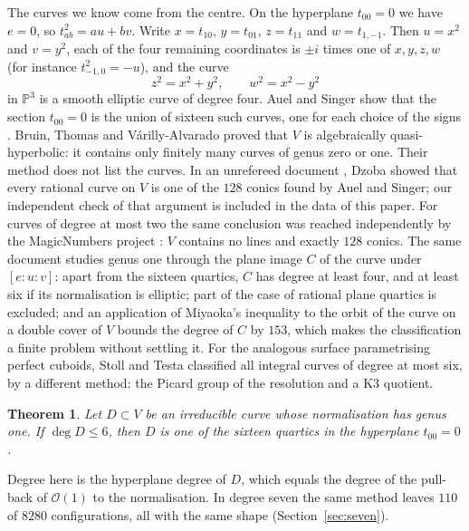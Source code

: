 \documentclass[11pt]{amsart}
\newtheorem{theorem}{Theorem}[section]
\theoremstyle{definition}
\newcommand{\PP}{\mathbb{P}}
\begin{document}
The curves we know come from the centre. On the hyperplane $t_{00}=0$ we have $e=0$, so $t_{ab}^2=au+bv$. Write
$x=t_{10}$, $y=t_{01}$, $z=t_{11}$ and $w=t_{1,-1}$. Then $u=x^2$ and $v=y^2$, each of the four remaining
coordinates is $\pm i$ times one of $x,y,z,w$ (for instance $t_{-1,0}^2=-u$), and the curve
\[
z^2=x^2+y^2,\qquad w^2=x^2-y^2
\]
in $\PP^3$ is a smooth elliptic curve of degree four. Auel and Singer show that the section $t_{00}=0$ is the union
of sixteen such curves, one for each choice of the signs \cite{AS}. Bruin, Thomas and
V\'arilly-Alvarado \cite{BTVA} proved that $V$ is algebraically quasi-hyperbolic: it contains only finitely many curves
of genus zero or one. Their method does not list the curves. In an unrefereed document \cite{Dz}, Dzoba showed that
every rational curve on $V$ is one of the $128$ conics found by Auel and Singer; our independent check of that
argument is included in the data of this paper. For curves of degree at most two the same conclusion was reached
independently by the MagicNumbers project \cite{MN}: $V$ contains no lines and exactly $128$ conics. The same document
\cite{Dz} studies genus one through the plane image $C$ of the curve under $[e:u:v]$: apart
from the sixteen quartics, $C$ has degree at least four, and at least six if its normalisation is elliptic; part of
the case of rational plane quartics is excluded; and an application of Miyaoka's inequality to the orbit of the curve
on a double cover of $V$ bounds the degree of $C$ by $153$, which makes the classification a finite problem without
settling it. For the analogous surface parametrising perfect cuboids, Stoll and Testa \cite{ST} classified all
integral curves of degree at most six, by a different method: the Picard group of the resolution and a K3 quotient.

\begin{theorem}\label{thm:main}
Let $D\subset V$ be an irreducible curve whose normalisation has genus one. If $\deg D\le 6$, then $D$ is one of the
sixteen quartics in the hyperplane $t_{00}=0$.
\end{theorem}

Degree here is the hyperplane degree of $D$, which equals the degree of the pull-back of $\mathcal O(1)$ to the
normalisation. In degree seven the same method leaves $110$ of $8280$ configurations, all with the same shape
(Section~\ref{sec:seven}).
\end{document}
